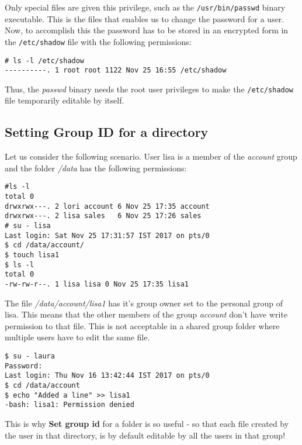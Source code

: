 \noindent
Only special files are given this privilege, such as the \verb|/usr/bin/passwd| binary executable. This is the files that enables us to change the password for a user. Now, to accomplish this the password has to be stored in an encrypted form in the \verb|/etc/shadow| file with the following permissions:

\vspace{-15pt}
\begin{verbatim}
# ls -l /etc/shadow
----------. 1 root root 1122 Nov 25 16:55 /etc/shadow
\end{verbatim}
\vspace{-10pt}

\noindent
Thus, the \textit{passwd} binary needs the root user privileges to make the \verb|/etc/shadow| file temporarily editable by itself. 

\subsection{Setting Group ID for a directory}
Let us consider the following scenario. User lisa is a member of the \textit{account} group and the folder \textit{/data} has the following permissions:

\vspace{-15pt}
\begin{verbatim}
#ls -l
total 0
drwxrwx---. 2 lori account 6 Nov 25 17:35 account
drwxrwx---. 2 lisa sales   6 Nov 25 17:26 sales
# su - lisa
Last login: Sat Nov 25 17:31:57 IST 2017 on pts/0
$ cd /data/account/
$ touch lisa1
$ ls -l
total 0
-rw-rw-r--. 1 lisa lisa 0 Nov 25 17:35 lisa1
\end{verbatim}
\vspace{-10pt}

\noindent
The file \textit{/data/account/lisa1} has it's group owner set to the personal group of lisa. This means that the other members of the group \textit{account} don't have write permission to that file. This is not acceptable in a shared group folder where multiple users have to edit the same file. 

\vspace{-15pt}
\begin{verbatim}
$ su - laura
Password: 
Last login: Thu Nov 16 13:42:44 IST 2017 on pts/0
$ cd /data/account
$ echo "Added a line" >> lisa1
-bash: lisa1: Permission denied
\end{verbatim}
\vspace{-10pt}

\noindent
This is why \textbf{Set group id} for a folder is so useful - so that each file created by the user in that directory, is by default editable by all the users in that group!

